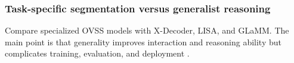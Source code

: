 \subsubsection{Task-specific segmentation versus generalist reasoning}
\label{subsubsec:specialist-vs-generalist}
Compare specialized OVSS models with X-Decoder, LISA, and GLaMM. The main point is that generality improves interaction and reasoning ability but complicates training, evaluation, and deployment \citep{zou2023xdecoder,lai2024lisa,rasheed2024glamm}.

